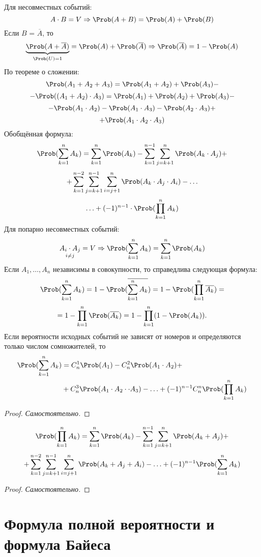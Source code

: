 Для несовместных событий:
\[
	A \cdot B = V \Rightarrow \Prob(A + B) = \Prob(A) + \Prob(B)
\]
Если $B$ = $\overline{A}$, то
\[
	\underbrace{\Prob(A + \overline{A})}_{\Prob(U) = 1} = \Prob(A) + \Prob(\overline{A}) \Rightarrow \Prob(\overline{A}) = 1 - \Prob(A)
\]
По теореме о сложении:
\[ \Prob(A_1 + A_2 + A_3) = \Prob(A_1 + A_2) + \Prob(A_3) -  \]
\[ - \Prob((A_1 + A_2) \cdot A_3) = \Prob(A_1) + \Prob(A_2) + \Prob(A_3) - \]	
\[ - \Prob(A_1 \cdot A_2) - \Prob(A_1 \cdot A_3) - \Prob(A_2 \cdot A_3) + \]
\[ + \Prob(A_1 \cdot A_2 \cdot A_3) \]
Обобщённая формула:
\[ \Prob(\sum\limits_{k=1}^n A_k) = \sum\limits_{k=1}^n \Prob(A_k) - \sum\limits_{k=1}^{n-1} \sum\limits_{j=k+1}^n \Prob(A_k \cdot A_j) + \]
\[
	+ \sum\limits_{k=1}^{n-2} \sum\limits_{j=k+1}^{n-1} \sum\limits_{i=j+1}^n \Prob(A_k \cdot A_j \cdot A_i) - \ldots 
\]
\[
	\ldots + (-1)^{n-1} \cdot \Prob(\prod\limits_{k=1}^n A_k)
\]
Для попарно несовместных событий:
\[
	\underset{i \not= j}{A_i \cdot A_j} = V \Rightarrow \Prob(\sum\limits_{k=1}^n A_k) = \sum\limits_{k=1}^n \Prob(A_k)
\]
Если $A_1, \dots, A_n$ независимы в совокупности, то справедлива следующая формула:
\[
	\Prob(\sum\limits_{k=1}^n A_k) = 1 - \Prob(\overline{\sum\limits_{k=1}^n A_k}) = 1 - \Prob(\prod\limits_{k=1}^n \overline{A_k}) =
\]
\[ = 1 - \prod\limits_{k=1}^n \Prob(\overline{A_k}) = 1 - \prod\limits_{k=1}^n(1 - \Prob(A_k)). \]
Если вероятности исходных событий не зависят от номеров и определяются только числом сомножителей, то
\[ \begin{split}
	\Prob(\sum\limits_{k=1}^n A_k) &= C_n^1 \Prob(A_1) - C_n^2 \Prob(A_1 \cdot A_2) + \\
	&+ C_n^3 \Prob(A_1 \cdot A_2 \cdot \cdot A_3) - \ldots + (-1)^{n-1} C_n^n \Prob(\prod\limits_{k=1}^n A_k)
\end{split} \]
\begin{proof}
	\textit{Самостоятельно.}
\end{proof}
\[ \Prob(\prod\limits_{k=1}^n A_k) = \sum\limits_{k=1}^n \Prob(A_k) - \sum\limits_{k=1}^{n-1} \sum\limits_{j=k+1}^{n} \Prob(A_k + A_j) + \]
\[ + \sum\limits_{k=1}^{n-2} \sum\limits_{j=k+1}^{n-1} \sum\limits_{i=j+1}^{n} \Prob(A_k + A_j + A_i) - \ldots + (-1)^{n-1} \Prob(\sum\limits_{k=1}^n A_k) \]
\begin{proof}
	\textit{Самостоятельно.}
\end{proof}
\section{Формула полной вероятности и формула Байеса}
